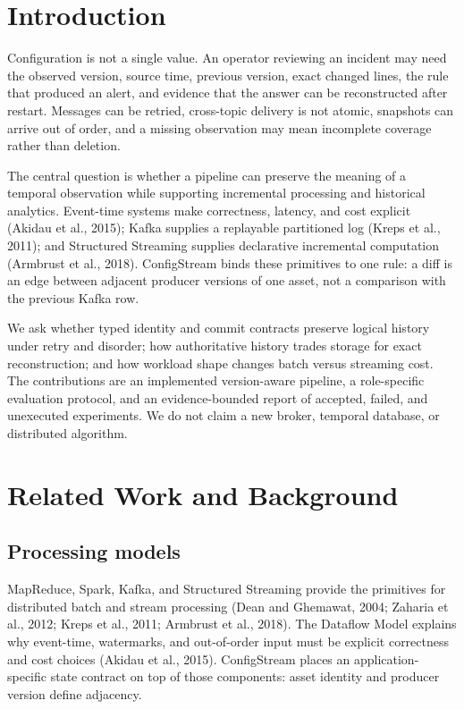 \clearpage
\section{Introduction}
Configuration is not a single value. An operator reviewing an incident may need the observed version, source time, previous version, exact changed lines, the rule that produced an alert, and evidence that the answer can be reconstructed after restart. Messages can be retried, cross-topic delivery is not atomic, snapshots can arrive out of order, and a missing observation may mean incomplete coverage rather than deletion.

The central question is whether a pipeline can preserve the meaning of a temporal observation while supporting incremental processing and historical analytics. Event-time systems make correctness, latency, and cost explicit (Akidau et al., 2015); Kafka supplies a replayable partitioned log (Kreps et al., 2011); and Structured Streaming supplies declarative incremental computation (Armbrust et al., 2018). ConfigStream binds these primitives to one rule: a diff is an edge between adjacent producer versions of one asset, not a comparison with the previous Kafka row.

We ask whether typed identity and commit contracts preserve logical history under retry and disorder; how authoritative history trades storage for exact reconstruction; and how workload shape changes batch versus streaming cost. The contributions are an implemented version-aware pipeline, a role-specific evaluation protocol, and an evidence-bounded report of accepted, failed, and unexecuted experiments. We do not claim a new broker, temporal database, or distributed algorithm.

\section{Related Work and Background}
\subsection{Processing models}
MapReduce, Spark, Kafka, and Structured Streaming provide the primitives for distributed batch and stream processing (Dean and Ghemawat, 2004; Zaharia et al., 2012; Kreps et al., 2011; Armbrust et al., 2018). The Dataflow Model explains why event-time, watermarks, and out-of-order input must be explicit correctness and cost choices (Akidau et al., 2015). ConfigStream places an application-specific state contract on top of those components: asset identity and producer version define adjacency.

